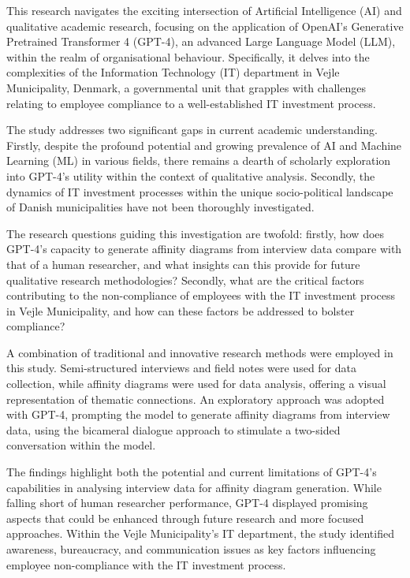 \documentclass[
]{book}
\author{}
\date{}
\begin{document}
\frontmatter

\mainmatter
This research navigates the exciting intersection of Artificial Intelligence (AI) and qualitative academic research, focusing on the application of OpenAI's Generative Pretrained Transformer 4 (GPT-4), an advanced Large Language Model (LLM), within the realm of organisational behaviour. Specifically, it delves into the complexities of the Information Technology (IT) department in Vejle Municipality, Denmark, a governmental unit that grapples with challenges relating to employee compliance to a well-established IT investment process.

The study addresses two significant gaps in current academic understanding. Firstly, despite the profound potential and growing prevalence of AI and Machine Learning (ML) in various fields, there remains a dearth of scholarly exploration into GPT-4's utility within the context of qualitative analysis. Secondly, the dynamics of IT investment processes within the unique socio-political landscape of Danish municipalities have not been thoroughly investigated.

The research questions guiding this investigation are twofold: firstly, how does GPT-4's capacity to generate affinity diagrams from interview data compare with that of a human researcher, and what insights can this provide for future qualitative research methodologies? Secondly, what are the critical factors contributing to the non-compliance of employees with the IT investment process in Vejle Municipality, and how can these factors be addressed to bolster compliance?

A combination of traditional and innovative research methods were employed in this study. Semi-structured interviews and field notes were used for data collection, while affinity diagrams were used for data analysis, offering a visual representation of thematic connections. An exploratory approach was adopted with GPT-4, prompting the model to generate affinity diagrams from interview data, using the bicameral dialogue approach to stimulate a two-sided conversation within the model.

The findings highlight both the potential and current limitations of GPT-4's capabilities in analysing interview data for affinity diagram generation. While falling short of human researcher performance, GPT-4 displayed promising aspects that could be enhanced through future research and more focused approaches. Within the Vejle Municipality's IT department, the study identified awareness, bureaucracy, and communication issues as key factors influencing employee non-compliance with the IT investment process.
\end{document}
